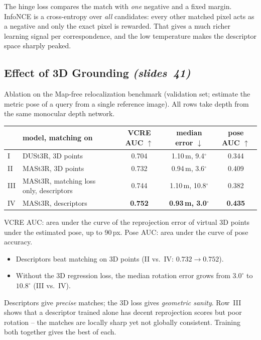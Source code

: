 \documentclass[11pt,a4paper]{article}
\newcommand{\slr}[1]{\texorpdfstring{\emph{(slides~#1)}}{(slides #1)}}
\theoremstyle{definition}
\begin{document}
\begin{intuition}
The hinge loss compares the match with \emph{one} negative and a fixed margin. InfoNCE is a cross-entropy over \emph{all} candidates: every other matched pixel acts as a negative and only the exact pixel is rewarded. That gives a much richer learning signal per correspondence, and the low temperature makes the descriptor space sharply peaked.
\end{intuition}

\subsection{Effect of 3D Grounding \slr{41}}
Ablation on the Map-free relocalization benchmark (validation set; estimate the metric pose of a query from a single reference image). All rows take depth from the same monocular depth network.
\begin{center}\small
\begin{tabular}{@{}llccc@{}}\toprule
 & model, matching on & VCRE AUC $\uparrow$ & median error $\downarrow$ & pose AUC $\uparrow$\\\midrule
I & DUSt3R, 3D points & 0.704 & 1.10\,m, 9.4$^\circ$ & 0.344\\
II & MASt3R, 3D points & 0.732 & 0.94\,m, 3.6$^\circ$ & 0.409\\
III & MASt3R, matching loss only, descriptors & 0.744 & 1.10\,m, 10.8$^\circ$ & 0.382\\
IV & MASt3R, descriptors & \textbf{0.752} & \textbf{0.93\,m, 3.0$^\circ$} & \textbf{0.435}\\\bottomrule
\end{tabular}
\end{center}
VCRE AUC: area under the curve of the reprojection error of virtual 3D points under the estimated pose, up to 90\,px. Pose AUC: area under the curve of pose accuracy.
\begin{itemize}
\item Descriptors beat matching on 3D points (II vs.\ IV: $0.732\to0.752$).
\item Without the 3D regression loss, the median rotation error grows from $3.0^\circ$ to $10.8^\circ$ (III vs.\ IV).
\end{itemize}
\begin{intuition}
Descriptors give \emph{precise} matches; the 3D loss gives \emph{geometric sanity}. Row~III shows that a descriptor trained alone has decent reprojection scores but poor rotation -- the matches are locally sharp yet not globally consistent. Training both together gives the best of each.
\end{intuition}
\end{document}
